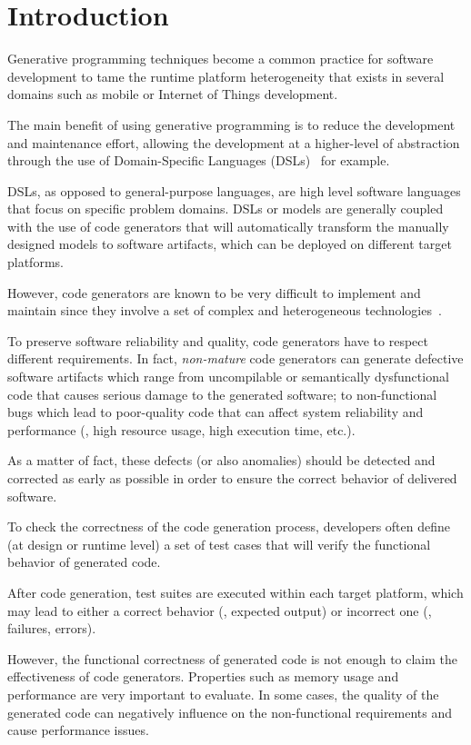 \section{Introduction}
\label{sec:cg_introduction}

Generative programming techniques become a common practice for software development to tame the runtime platform heterogeneity that exists in several domains such as mobile or Internet of Things development. 

The main benefit of using generative programming is to reduce the development and maintenance effort, allowing the development at a higher-level of abstraction through the use of Domain-Specific Languages (DSLs)~\cite{brambilla2012model} for example. 

DSLs, as opposed to general-purpose languages, are high level software languages that focus on specific problem domains. 
DSLs or models are generally coupled with the use of code generators that will automatically transform the manually designed models to software artifacts, which can be deployed on different target platforms. 

However, code generators are known to be very difficult to implement and maintain since they involve a set of complex and heterogeneous technologies~\cite{france2007model,guana2015developers}.

To preserve software reliability and quality, code generators have to respect different requirements. In fact, \textit{non-mature} code generators can generate defective software artifacts which range from uncompilable or semantically dysfunctional code that causes serious damage to the generated software; to non-functional bugs which lead to poor-quality code that can affect system reliability and performance (\eg, high resource usage, high execution time, etc.). 

As a matter of fact, these defects (or also anomalies) should be detected and corrected as early as possible in order to ensure the correct behavior of delivered software.

To check the correctness of the code generation process, developers often define (at design or runtime level) a set of test cases that will verify the functional behavior of generated code. 

After code generation, test suites are executed within each target platform, which may lead to either a correct behavior (\ie, expected output) or incorrect one (\ie, failures, errors).

However, the functional correctness of generated code is not enough to claim the effectiveness of code generators. Properties such as memory usage and performance are very important to evaluate. In some cases, the quality of the generated code can negatively influence on the non-functional requirements and cause performance issues\cite{hundt2011loop,ray2014large}.

